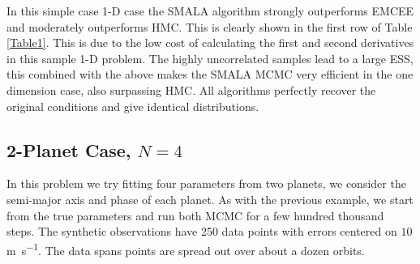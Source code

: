 \documentclass{aa}
\begin{document}
In this simple case 1-D case the SMALA algorithm strongly outperforms EMCEE and moderately outperforms HMC. This is clearly shown in the first row of Table \ref{Table1}. This is due to the low cost of calculating the first and second derivatives in this sample 1-D problem. The highly uncorrelated samples lead to a large ESS, this combined with the above makes the SMALA MCMC very efficient in the one dimension case, also surpassing HMC. All algorithms perfectly recover the original conditions and give identical distributions.

\begin{table}
\caption{MCMC Efficiency Results}             %
\label{Table1}      %
\centering                         
{}
\end{table}

\subsection{2-Planet Case, $N=4$}\label{n4section}

In this problem we try fitting four parameters from two planets, we consider the semi-major axis and phase of each planet. As with the previous example, we start from the true parameters and run both MCMC for a few hundred thousand steps. The synthetic observations have 250 data points with errors centered on $10$ \si{\metre\per\second}. The data spans points are spread out over about a dozen orbits.
\end{document}
